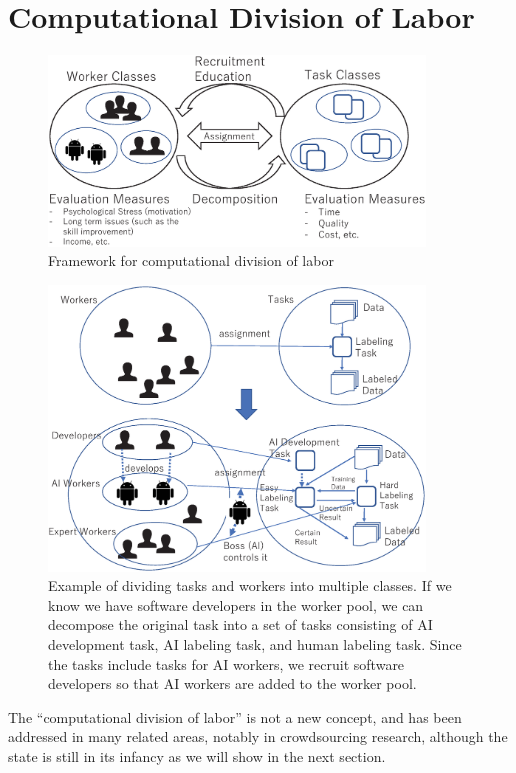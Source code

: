 \section{Computational Division of Labor}
\label{sec:computationaldivisionoflabor}


\begin{figure}[t]
    \centering
    \includegraphics[width=100mm]{submissions/morishima/figures/framework.eps}
    \caption{Framework for computational division of labor}
    \label{fig:framework}
\end{figure}

\begin{figure}[t]
    \centering
    \includegraphics[width=100mm]{submissions/morishima/figures/dol-example1.eps}
    \caption{Example of dividing tasks and workers into multiple classes. If we know we have software developers in the worker pool, we can decompose the original task into a set of tasks consisting of AI development task, AI labeling task, and human labeling task. Since the tasks include tasks for AI workers, we recruit software developers so that AI workers are added to the worker pool.}
    \label{fig:example}
\end{figure}

The ``computational division of labor'' is not a new concept, and has been addressed in many related areas, notably in crowdsourcing research, although the state is still in its infancy as we will show in the next section.

